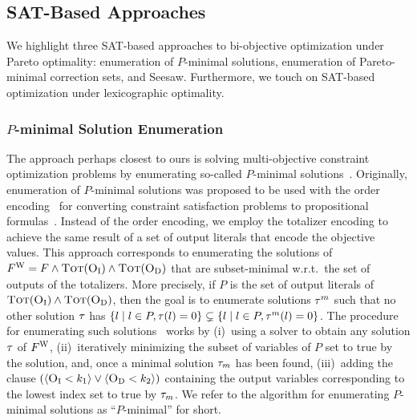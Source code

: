 \subsection{SAT-Based Approaches\label{sec:sat-based}}

We highlight three SAT-based approaches to bi-objective optimization under Pareto optimality:
enumeration of $P$-minimal solutions, enumeration of Pareto-minimal correction sets, and Seesaw.
Furthermore, we touch on SAT-based optimization under lexicographic optimality.

\subsubsection{$P$-minimal Solution Enumeration\label{sec:p-minimal}}

The approach perhaps closest to ours is solving multi-objective constraint optimization problems by enumerating so-called $P$-minimal solutions~\autocites{DBLP:conf/cp/SohBTB17,DBLP:conf/ftp/KoshimuraNFH09}.
Originally, enumeration of $P$-minimal solutions was proposed to be used with the order encoding~\autocite{DBLP:conf/ictai/TamuraBS13} for converting constraint satisfaction problems to propositional formulas~\autocite{DBLP:conf/cp/SohBTB17}.
Instead of the order encoding, we employ the totalizer encoding to achieve the same result of a set of output literals that encode the objective values.
This approach corresponds to enumerating the solutions of $F^\text{W} = F \land \textsc{Tot}(\textsc{O}_{\text{I}}) \land \textsc{Tot}(\textsc{O}_{\text{D}})$ that are subset-minimal w.r.t.\ the set of outputs of the totalizers.
More precisely, if $P$ is the set of output literals of $\textsc{Tot}(\textsc{O}_{\text{I}}) \land \textsc{Tot}(\textsc{O}_{\text{D}})$, then the goal is to enumerate solutions $\tau^m$ such that no other solution $\tau$ has $\{ l \mid l \in P, \tau(l) = 0\} \subsetneq \{ l \mid l \in P, \tau^m(l) = 0\}$.
The procedure for enumerating such solutions~\autocite{DBLP:conf/ftp/KoshimuraNFH09} works by (i)~using a solver to obtain any solution $\tau$ of $F^\text{W}$, (ii)~iteratively minimizing the subset of variables of $P$ set to true by the solution, and, once a minimal solution $\tau_m$ has been found, (iii)~adding the clause $(\langle \textsc{O}_{\text{I}} < k_1 \rangle \lor \langle \textsc{O}_{\text{D}} < k_2 \rangle)$ containing the output variables corresponding to the lowest index set to true by $\tau_m$.
We refer to the algorithm for enumerating $P$-minimal solutions as ``$P$-minimal'' for short.

